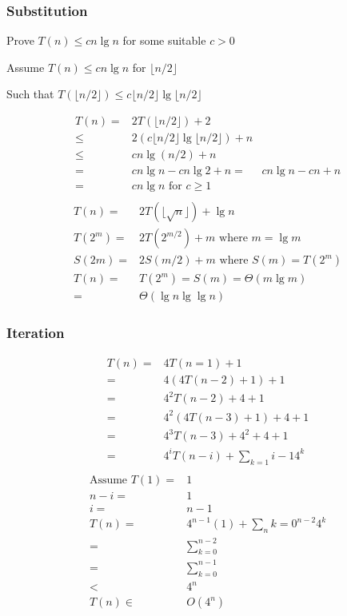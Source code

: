 \documentclass[10pt, a4paper,landscape]{article}
\begin{document}
\begin{multicols*}{4}

\subsubsection{Substitution}
\begin{compactitem}
    \item[Prove] $T(n) \leq cn \lg n$ for some suitable $c > 0$
    \item[Assume] $T(n) \leq cn \lg n$ for $\lfloor n / 2 \rfloor$
    \item[Such that] $T(\lfloor n / 2 \rfloor) \leq c \lfloor n / 2 \rfloor \lg \lfloor n / 2 \rfloor$
\end{compactitem}
\begin{align*}
T(n) =& 2T(\lfloor n / 2 \rfloor) + 2\\
     \leq& 2(c \lfloor n / 2 \rfloor \lg \lfloor n / 2 \rfloor) + n\\
     \leq& cn \lg(n /2) + n\\
     =& cn \lg n - cn \lg 2 + n
     =& cn \lg n - cn + n\\
     =&  cn \lg n \text{ for } c \geq 1\\
\end{align*}
\begin{align*}
    T(n) =& 2T(\lfloor \sqrt{n} \rfloor) + \lg n\\
    T(2^m) =& 2T(2^{m/2}) + m \text{ where } m = \lg m\\
    S(2m) =& 2S(m / 2) + m \text{ where } S(m) = T(2^m)\\
    T(n) =& T(2^m) = S(m) = \Theta(m \lg m)\\
        =& \Theta(\lg n \lg \lg n)
\end{align*}

\subsubsection{Iteration}
\begin{align*}
T(n) =& 4T(n = 1) + 1\\
     =& 4(4T(n - 2) + 1) + 1\\
     =& 4^2T(n - 2) + 4 + 1\\
     =& 4^2(4T(n - 3) + 1) + 4 + 1\\
     =& 4^3T(n - 3) + 4^2 + 4 + 1\\
     =& 4^iT(n - i) + \sum_{k =1}{i - 1} 4^k\\
\end{align*}
\begin{align*}
\text{Assume } T(1) =& 1\\
n - i =& 1\\
    i =& n - 1\\
T(n) =& 4^{n - 1}(1) + \sum_n{k = 0}^{n -2} 4^k\\
     =& \sum_{k = 0}^{n - 2}\\
     =& \sum_{k = 0}^{n - 1}\\
     <& 4^n\\
T(n) \in& O(4^n)\\
\end{align*}


\end{multicols*}
\end{document}
